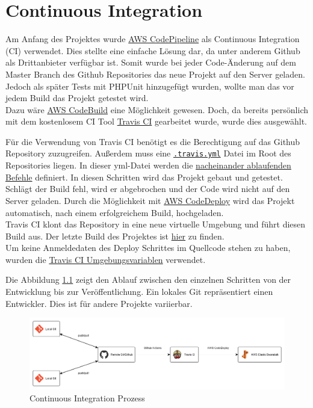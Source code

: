 \chapter{Continuous Integration}\label{ch:continuous-integration}
Am Anfang des Projektes wurde \href{https://aws.amazon.com/de/codepipeline/}{AWS CodePipeline} als Continuous Integration (CI) verwendet. Dies stellte eine einfache Lösung dar, da unter anderem Github als Drittanbieter verfügbar ist. Somit wurde bei jeder Code-Änderung auf dem Master Branch des Github Repositories das neue Projekt auf den Server geladen.\\
Jedoch als später Tests mit PHPUnit hinzugefügt wurden, wollte man das vor jedem Build das Projekt getestet wird.\\
Dazu wäre \href{https://aws.amazon.com/de/codebuild/}{AWS CodeBuild} eine Möglichkeit gewesen. Doch, da bereits persönlich mit dem kostenlosem CI Tool \href{https://travis-ci.com/}{Travis CI} gearbeitet wurde, wurde dies ausgewählt.

Für die Verwendung von Travis CI benötigt es die Berechtigung auf das Github Repository zuzugreifen. Außerdem muss eine \href{https://github.com/Drinkler/Planning-Poker/blob/master/.travis.yml}{\lstinline{.travis.yml}} Datei im Root des Repositories liegen. In dieser yml-Datei werden die \href{https://docs.travis-ci.com/user/job-lifecycle/}{nacheinander ablaufenden Befehle} definiert. In diesen Schritten wird das Projekt gebaut und getestet. Schlägt der Build fehl, wird er abgebrochen und der Code wird nicht auf den Server geladen. Durch die Möglichkeit mit \href{https://docs.travis-ci.com/user/deployment/codedeploy/}{AWS CodeDeploy} wird das Projekt automatisch, nach einem erfolgreichem Build, hochgeladen.\\
Travis CI klont das Repository in eine neue virtuelle Umgebung und führt diesen Build aus. Der letzte Build des Projektes ist \href{https://travis-ci.com/github/Drinkler/Planning-Poker}{hier} zu finden.\\
Um keine Anmeldedaten des Deploy Schrittes im Quellcode stehen zu haben, wurden die \href{https://docs.travis-ci.com/user/environment-variables/}{Travis CI Umgebungsvariablen} verwendet.

Die Abbildung \ref{ci} zeigt den Ablauf zwischen den einzelnen Schritten von der Entwicklung bis zur Veröffentlichung. Ein lokales Git repräsentiert einen Entwickler. Dies ist für andere Projekte variierbar.

\begin{figure}[H]
	\centering
  \includegraphics[width=\textwidth]{images/continuous_integration.png}
	\caption{Continuous Integration Prozess}
	\label{ci}
\end{figure}